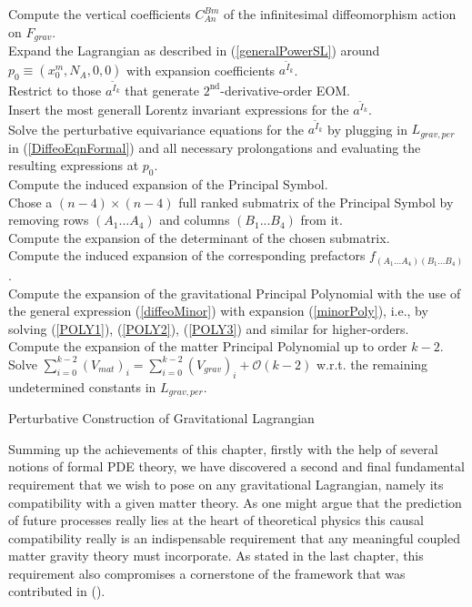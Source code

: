 \begin{algorithm}[hbt!]
\SetAlgoLined
{}
Compute the vertical coefficients $C^{Bm}_{An}$ of the infinitesimal diffeomorphism action on $F_{grav}$. \\
Expand the Lagrangian as described in (\ref{generalPowerSL}) around $p_0 \equiv (x_0^m,N_A,0,0)$ with expansion coefficients $a^{\tilde{I}_k}$.\\
Restrict to those $a^{\tilde{I}_k}$ that generate $2^{\text{nd}}$-derivative-order EOM. \\
Insert the most generall Lorentz invariant expressions for the $a^{\tilde{I}_k}$.\\
Solve the perturbative equivariance equations for the $a^{\tilde{I}_k}$ by plugging in $L_{grav,per}$ in (\ref{DiffeoEqnFormal}) and all necessary prolongations and evaluating the resulting expressions at $p_0$.\\
Compute the induced expansion of the Principal Symbol.\\
Chose a $(n-4) \times (n-4)$ full ranked submatrix of the Principal Symbol by removing rows $(A_1...A_4)$ and columns $(B_1...B_4)$ from it. \\
Compute the expansion of the determinant of the chosen submatrix.\\
Compute the induced expansion of the corresponding prefactors $f_{(A_1...A_4)(B_1...B_4)}$. \\
Compute the expansion of the gravitational Principal Polynomial with the use of the general expression (\ref{diffeoMinor}) with expansion (\ref{minorPoly}), i.e., by solving (\ref{POLY1}), (\ref{POLY2}), (\ref{POLY3}) and similar for higher-orders. \\
Compute the expansion of the matter Principal Polynomial up to order $k-2$.\\
Solve $\sum_{i=0}^{k-2} (V_{mat})_i = \sum _{i=0}^{k-2}(V_{grav})_i + \mathcal{O}(k-2)$ w.r.t. the remaining undetermined constants in $L_{grav,per}$.
 \caption{Perturbative Construction of Gravitational Lagrangian}\label{Algo2}
\end{algorithm}

Summing up the achievements of this chapter, firstly with the help of several notions of formal PDE theory, we have discovered a second and final fundamental requirement that we wish to pose on any gravitational Lagrangian, namely its compatibility with a given matter theory. As one might argue that the prediction of future processes really lies at the heart of theoretical physics this causal compatibility really is an indispensable requirement that any meaningful coupled matter gravity theory must incorporate. As stated in the last chapter, this requirement also compromises a cornerstone of the framework that was contributed in (\cite{2018PhRvD..97h4036D}). 

